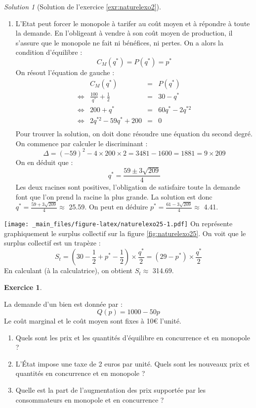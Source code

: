 \documentclass[
]{book}
\providecommand{\tightlist}{%
  \setlength{\itemsep}{0pt}\setlength{\parskip}{0pt}}
\theoremstyle{definition}
\theoremstyle{definition}
\theoremstyle{definition}
\newtheorem{exercise}{Exercice}[chapter]
\theoremstyle{definition}
\theoremstyle{remark}
\newtheorem*{solution}{Solution}
\begin{document}
\begin{solution}[Solution de l'exercice \ref{exr:naturelexo2}]
\begin{enumerate}
\def\labelenumi{\arabic{enumi}.}
\setcounter{enumi}{4}
\tightlist
\item
  L'Etat peut forcer le monopole à tarifer au coût moyen et à répondre à toute la demande.
  En l'obligeant à vendre à son coût moyen de production, il s'assure que le monopole ne fait ni bénéfices, ni pertes.
  On a alors la condition d'équilibre :
  \[C_M(q^*)=P(q^*)=p^*\]
  On résout l'équation de gauche :
  \[
  \begin{array}{crcl}
  &C_M(q^*)&=&P(q^*)\\
  \Leftrightarrow&\frac{100}{q^*}+\frac{1}{2}&=&30-q^*\\
  \Leftrightarrow&200+q^*&=&60q^*-2q^{*2}\\
  \Leftrightarrow&2q^{*2}-59q^*+200&=&0\\
  \end{array}
  \]
  Pour trouver la solution, on doit donc résoudre une équation du second degré.
  On commence par calculer le discriminant :
  \[\Delta=(-59)^2-4\times200\times2=3481-1600=1881=9\times209\]
  On en déduit que :
  \[q^*=\frac{59\pm3\sqrt{209}}{4}\]
  Les deux racines sont positives, l'obligation de satisfaire toute la demande font que l'on prend la racine la plus grande.
  La solution est donc \(q^*=\frac{59+3\sqrt{209}}{4}\approx\) 25.59.
  On peut en déduire \(p^*=\frac{61-3\sqrt{209}}{4}\approx\) 4.41.
\end{enumerate}

\texttt{[image: \_main\_files/figure-latex/naturelexo25-1.pdf]}
On représente graphiquement le surplus collectif sur la figure \ref{fig:naturelexo25}.
On voit que le surplus collectif est un trapèze : \[S_t=\left(30−\frac{1}{2}+p^*−\frac{1}{2}\right)×\frac{q^*}{2}=(29−p^*)\times \frac{q^*}{2}\]
En calculant (à la calculatrice), on obtient \(S_t\approx\) 314.69.

\end{solution}

\begin{exercise}
\protect\hypertarget{exr:naturelexo3}{}\label{exr:naturelexo3}

La demande d'un bien est donnée par : \[Q\left(p\right)=1000-50p\] Le coût
marginal et le coût moyen sont fixes à 10€ l'unité.

\begin{enumerate}
\def\labelenumi{\arabic{enumi}.}
\tightlist
\item
  Quels sont les prix et les quantités d'équilibre en concurrence
  et en monopole ?
\item
  L'État impose une taxe de 2 euros par unité. Quels sont les nouveaux prix et quantités en concurrence et en monopole ?
\item
  Quelle est la part de l'augmentation des prix supportée par les consommateurs en monopole et en concurrence ?
\end{enumerate}

\end{exercise}
\end{document}
